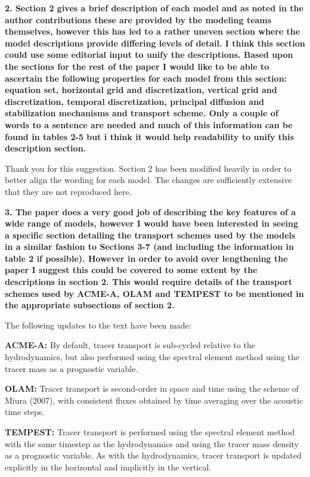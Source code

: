 \documentclass{article}
\begin{document}
\textbf{{2. Section 2 gives a brief description of each model and as noted in the author contributions
these are provided by the modeling teams themselves, however this
has led to a rather uneven section where the model descriptions provide differing
levels of detail. I think this section could use some editorial input to unify the
descriptions. Based upon the sections for the rest of the paper I would like to be
able to ascertain the following properties for each model from this section: equation
set, horizontal grid and discretization, vertical grid and discretization, temporal
discretization, principal diffusion and stabilization mechanisms and transport
scheme. Only a couple of words to a sentence are needed and much of this
information can be found in tables 2-5 but i think it would help readability to unify
this description section.}}

Thank you for this suggestion.  Section 2 has been modified heavily in order to better align the wording for each model.  The changes are sufficiently extensive that they are not reproduced here.

\textbf{{3. The paper does a very good job of describing the key features of a wide range of
models, however I would have been interested in seeing a specific section detailing
the transport schemes used by the models in a similar fashion to Sections 3-7
(and including the information in table 2 if possible). However in order to avoid
over lengthening the paper I suggest this could be covered to some extent by
the descriptions in section 2. This would require details of the transport schemes
used by ACME-A, OLAM and TEMPEST to be mentioned in the appropriate subsections
of section 2.}}

The following updates to the text have been made:

\textbf{ACME-A:}  {\color{blue}By default, tracer transport is sub-cycled relative to the hydrodynamics, but also performed using the spectral element method using the tracer mass as a prognostic variable.}

\textbf{OLAM:}  {\color{blue}Tracer transport is second-order in space and time using the scheme of Miura (2007), with consistent fluxes obtained by time averaging over the acoustic time steps.}

\textbf{TEMPEST:}  {\color{blue}Tracer transport is performed using the spectral element method with the same timestep as the hydrodynamics and using the tracer mass density as a prognostic variable.  As with the hydrodynamics, tracer transport is updated explicitly in the horizontal and implicitly in the vertical.}
\end{document}
